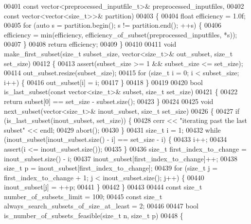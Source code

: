 \begin{DoxyCode}
{{00401         \textcolor{keyword}{const} vector<preprocessed\_inputfile\_t>& preprocessed\_inputfiles,
00402         \textcolor{keyword}{const} vector<vector<size\_t>>& partition)
00403 \{
00404   \textcolor{keywordtype}{float} efficiency = 1.0f;
00405   \textcolor{keywordflow}{for} (\textcolor{keyword}{auto} s = partition.begin(); s != partition.end(); ++s) \{
00406     efficiency = min(efficiency, efficiency\_of\_subset(preprocessed\_inputfiles, *s));
00407   \}
00408   \textcolor{keywordflow}{return} efficiency;
00409 \}
00410 
00411 \textcolor{keywordtype}{void} make\_first\_subset(\textcolor{keywordtype}{size\_t} subset\_size, vector<size\_t>& out\_subset, \textcolor{keywordtype}{size\_t} set\_size)
00412 \{
00413   assert(subset\_size >= 1 && subset\_size <= set\_size);
00414   out\_subset.resize(subset\_size);
00415   \textcolor{keywordflow}{for} (\textcolor{keywordtype}{size\_t} i = 0; i < subset\_size; i++) \{
00416     out\_subset[i] = i;
00417   \}
00418 \}
00419 
00420 \textcolor{keywordtype}{bool} is\_last\_subset(\textcolor{keyword}{const} vector<size\_t>& subset, \textcolor{keywordtype}{size\_t} set\_size)
00421 \{
00422   \textcolor{keywordflow}{return} subset[0] == set\_size - subset.size();
00423 \}
00424 
00425 \textcolor{keywordtype}{void} next\_subset(vector<size\_t>& inout\_subset, \textcolor{keywordtype}{size\_t} set\_size)
00426 \{
00427   \textcolor{keywordflow}{if} (is\_last\_subset(inout\_subset, set\_size)) \{
00428     cerr << \textcolor{stringliteral}{"iterating past the last subset"} << endl;
00429     abort();
00430   \}
00431   \textcolor{keywordtype}{size\_t} i = 1;
00432   \textcolor{keywordflow}{while} (inout\_subset[inout\_subset.size() - i] == set\_size - i) \{
00433     i++;
00434     assert(i <= inout\_subset.size());
00435   \}
00436   \textcolor{keywordtype}{size\_t} first\_index\_to\_change = inout\_subset.size() - i;
00437   inout\_subset[first\_index\_to\_change]++;
00438   \textcolor{keywordtype}{size\_t} p = inout\_subset[first\_index\_to\_change];
00439   \textcolor{keywordflow}{for} (\textcolor{keywordtype}{size\_t} j = first\_index\_to\_change + 1; j < inout\_subset.size(); j++) \{
00440     inout\_subset[j] = ++p;
00441   \}
00442 \}
00443 
00444 \textcolor{keyword}{const} \textcolor{keywordtype}{size\_t} number\_of\_subsets\_limit = 100;
00445 \textcolor{keyword}{const} \textcolor{keywordtype}{size\_t} always\_search\_subsets\_of\_size\_at\_least = 2;
00446 
00447 \textcolor{keywordtype}{bool} is\_number\_of\_subsets\_feasible(\textcolor{keywordtype}{size\_t} n, \textcolor{keywordtype}{size\_t} p)
00448 \{ 
}}
\end{DoxyCode}

